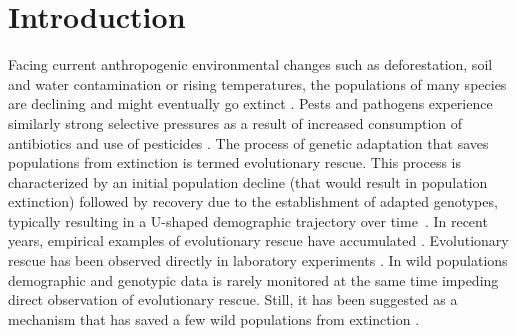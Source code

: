 \documentclass[a4paper,11pt]{article}
\newcommand{\chg}[1]{\textcolor{change}{#1}}
\begin{document}
\section*{Introduction}

Facing current anthropogenic environmental changes such as deforestation, soil and water contamination or rising temperatures, the populations of many species are declining and might eventually go extinct \citep{bellard_2012, diniz_2019}. Pests and pathogens experience similarly strong selective pressures as a result of increased consumption of antibiotics and use of pesticides \citep{ramsayer_2013, kreiner_2018}. 
The process of genetic adaptation that saves populations from extinction is termed evolutionary rescue. This \chg{process is characterized by an initial population decline (that would result in population extinction) followed by recovery due to the establishment of adapted genotypes, typically }resulting in a U-shaped demographic trajectory over time~\citep{gomulkiewicz_1995}.
In recent years, empirical examples of evolutionary rescue have accumulated \citep[as reviewed by ][]{alexander_2014,carlson_2014,bell_2017}. Evolutionary rescue \chg{has been observed directly in laboratory experiments \citep[e.g.][]{bell_2009,agashe_2011,lachapelle_2012,lindsey_2013,stelkens_2014}. In wild populations demographic and genotypic data is rarely monitored at the same time impeding direct observation of evolutionary rescue. Still, it has been suggested as a mechanism that has saved a few wild populations from extinction \citep[e.g.][]{vanderwal_2012,digiallonardo_2015,gignoux_2018}.} 
\end{document}
